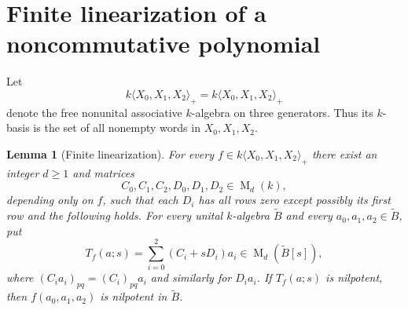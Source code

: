 \documentclass[11pt]{article}
\newtheorem{lemma}[theorem]{Lemma}
\newcommand{\Mat}{\operatorname{M}}
\newcommand{\Free}{k\langle X_0,X_1,X_2\rangle_+}
\begin{document}
\section{Finite linearization of a noncommutative polynomial}\label{sec:linearization}

Let
\[
\Free=k\langle X_0,X_1,X_2\rangle_+
\]
denote the free nonunital associative $k$-algebra on three generators.  Thus its $k$-basis is the set of all nonempty words in $X_0,X_1,X_2$.

\begin{lemma}[Finite linearization]\label{lem:linearization}
For every $f\in\Free$ there exist an integer $d\ge1$ and matrices
\[
C_0,C_1,C_2,D_0,D_1,D_2\in\Mat_d(k),
\]
depending only on $f$, such that each $D_i$ has all rows zero except possibly its first row and the following holds.  For every unital $k$-algebra $\widetilde B$ and every $a_0,a_1,a_2\in\widetilde B$, put
\begin{equation}\label{eq:linearized-operator}
T_f(a;s)=\sum_{i=0}^2(C_i+sD_i)a_i\in\Mat_d(\widetilde B[s]),
\end{equation}
where $(C_i a_i)_{pq}=(C_i)_{pq}a_i$ and similarly for $D_i a_i$.  If $T_f(a;s)$ is nilpotent, then $f(a_0,a_1,a_2)$ is nilpotent in $\widetilde B$.
\end{lemma}
\end{document}
